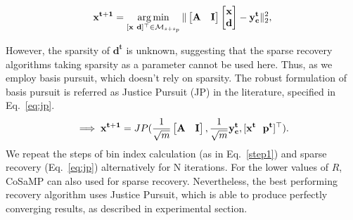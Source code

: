 $$
\mathbf{{x}^{t+1}}=\argmin_{[\mathbf{x~d}]^\t \in \mathcal{M}_{s+s_p}}\norm{\begin{bmatrix} \mathbf{A} & \mathbf{I} \end{bmatrix} \begin{bmatrix} \mathbf{x} \\ \mathbf{d} \end{bmatrix} - \mathbf{y^t_c}}_2^2, %
$$

 However, the sparsity of $\mathbf{d^t}$ is unknown, suggesting that the sparse recovery algorithms taking sparsity as a parameter cannot be used here. Thus, as we employ basis pursuit, which doesn't rely on sparsity. The robust formulation of basis pursuit is referred as Justice Pursuit (JP) in the literature, specified in Eq.~\ref{eq:jp}.
\begin{equation}
\implies \mathbf{{x^{t+1}}} = JP(\frac{1}{\sqrt{m}}\begin{bmatrix} \mathbf{A} & \mathbf{I} \end{bmatrix},\frac{1}{\sqrt{m}}\mathbf{y^t_c},[\mathbf{x^t~~p^t}]^\t).
\label{eq:jp}
\end{equation}
We repeat the steps of bin index calculation (as in Eq.~\ref{step1}) and sparse recovery (Eq.~\ref{eq:jp}) alternatively for $\mathrm{N}$ iterations. For the lower values of $R$, CoSaMP can also used for sparse recovery. Nevertheless, the best performing recovery algorithm uses Justice Pursuit, which is able to produce perfectly converging results, as described in experimental section.



%
